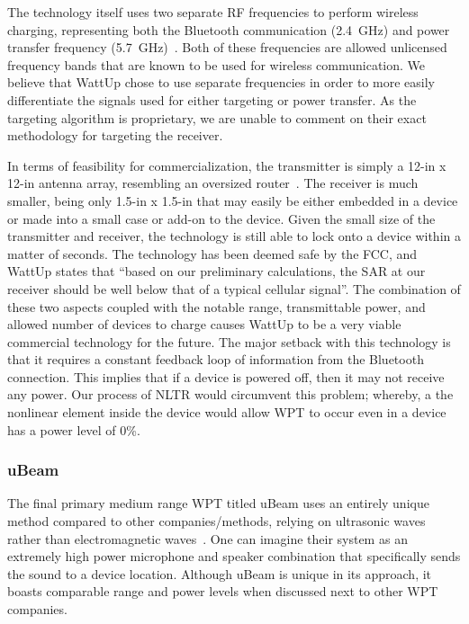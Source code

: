 The technology itself uses two separate RF frequencies to perform wireless charging, representing both the Bluetooth communication (2.4~GHz) and power transfer frequency (5.7~GHz)~\cite{energouscorporation2016}. Both of these frequencies are allowed unlicensed frequency bands that are known to be used for wireless communication. We believe that WattUp chose to use separate frequencies in order to more easily differentiate the signals used for either targeting or power transfer. As the targeting algorithm is proprietary, we are unable to comment on their exact methodology for targeting the receiver.

In terms of feasibility for commercialization, the transmitter is simply a 12-in x 12-in antenna array, resembling an oversized router~\cite{energouscorporation2016}. The receiver is much smaller, being only 1.5-in x 1.5-in that may easily be either embedded in a device or made into a small case or add-on to the device. Given the small size of the transmitter and receiver, the technology is still able to lock onto a device within a matter of seconds. The technology has been deemed safe by the FCC, and WattUp states that ``based on our preliminary calculations, the SAR at our receiver should be well below that of a typical cellular signal''. The combination of these two aspects coupled with the notable range, transmittable power, and allowed number of devices to charge causes WattUp to be a very viable commercial technology for the future. The major setback with this technology is that it requires a constant feedback loop of information from the Bluetooth connection. This implies that if a device is powered off, then it may not receive any power. Our process of NLTR would circumvent this problem; whereby, a the nonlinear element inside the device would allow WPT to occur even in a device has a power level of 0\%.

\subsubsection{uBeam}
The final primary medium range WPT titled uBeam uses an entirely unique method compared to other companies/methods, relying on ultrasonic waves rather than electromagnetic waves~\cite{ubeam2016}. One can imagine their system as an extremely high power microphone and speaker combination that specifically sends the sound to a device location. Although uBeam is unique in its approach, it boasts comparable range and power levels when discussed next to other WPT companies.

